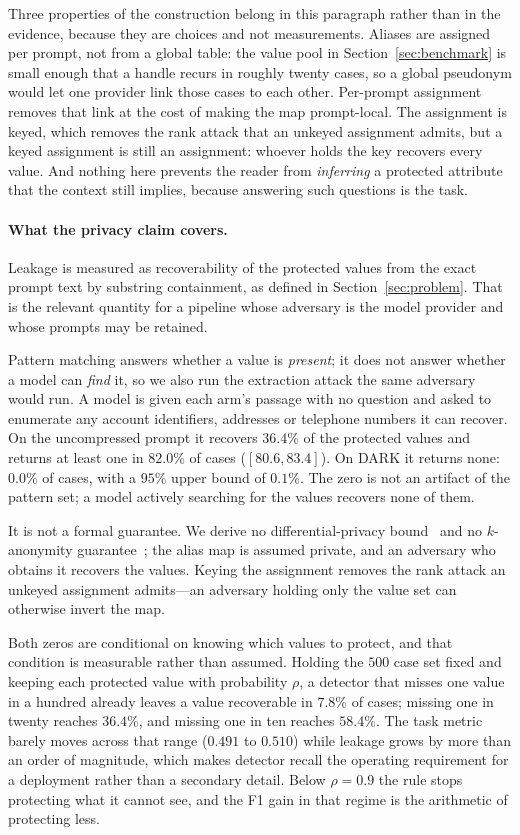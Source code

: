 Three properties of the construction belong in this paragraph rather than in the evidence,
because they are choices and not measurements. Aliases are assigned per prompt, not from a
global table: the value pool in Section~\ref{sec:benchmark} is small enough that a handle
recurs in roughly twenty cases, so a global pseudonym would let one provider link those cases
to each other. Per-prompt assignment removes that link at the cost of making the map
prompt-local. The assignment is keyed, which removes the rank attack that an unkeyed
assignment admits, but a keyed assignment is still an assignment: whoever holds the key
recovers every value. And nothing here prevents the reader from \emph{inferring} a protected
attribute that the context still implies, because answering such questions is the task.

\paragraph{What the privacy claim covers.}
Leakage is measured as recoverability of the protected values from the exact prompt text by
substring containment, as defined in Section~\ref{sec:problem}. That is the
relevant quantity for a pipeline whose adversary is the model provider and whose prompts may
be retained.

Pattern matching answers whether a value is \emph{present}; it does not answer whether a model can
\emph{find} it, so we also run the extraction attack the same adversary would run. A model is given
each arm's passage with no question and asked to enumerate any account identifiers, addresses or
telephone numbers it can recover. On the uncompressed prompt it recovers $36.4\%$ of the protected
values and returns at least one in $82.0\%$ of cases ($[80.6,83.4]$). On \textsc{DARK} it returns
none: $0.0\%$ of cases, with a $95\%$ upper bound of $0.1\%$. The zero is not an artifact of the
pattern set; a model actively searching for the values recovers none of them.

It is not a formal guarantee. We derive no differential-privacy
bound~\cite{zhao-dp-2024} and no $k$-anonymity
guarantee~\cite{carvalho-microdata-2023}; the alias map is assumed private, and an adversary who
obtains it recovers the values. Keying the assignment removes the rank attack an unkeyed
assignment admits---an adversary holding only the value set can otherwise invert the map.

Both zeros are conditional on knowing which values to protect, and that condition is measurable
rather than assumed. Holding the $500$ case set fixed and keeping each protected value with
probability $\rho$, a detector that misses one value in a hundred already leaves a value
recoverable in $7.8\%$ of cases; missing one in twenty reaches $36.4\%$, and missing one in ten
reaches $58.4\%$. The task metric barely moves across that range ($0.491$ to $0.510$) while leakage
grows by more than an order of magnitude, which makes detector recall the operating requirement for
a deployment rather than a secondary detail. Below $\rho=0.9$ the rule stops protecting what it
cannot see, and the F1 gain in that regime is the arithmetic of protecting less.


